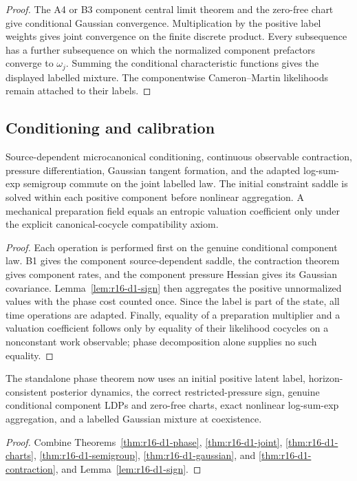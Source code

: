 \begin{proof}
The A4 or B3 component central limit theorem and the zero-free chart give
conditional Gaussian convergence.  Multiplication by the positive label
weights gives joint convergence on the finite discrete product.  Every
subsequence has a further subsequence on which the normalized component
prefactors converge to \(\omega_j\).  Summing the conditional characteristic
functions gives the displayed labelled mixture.  The componentwise
Cameron--Martin likelihoods remain attached to their labels.
\end{proof}

\subsection{Conditioning and calibration}

\begin{theorem}
\label{thm:r16-d1-contraction}
Source-dependent microcanonical conditioning, continuous observable
contraction, pressure differentiation, Gaussian tangent formation, and the
adapted log-sum-exp semigroup commute on the joint labelled law.  The initial
constraint saddle is solved within each positive component before nonlinear
aggregation.  A mechanical preparation field equals an entropic valuation
coefficient only under the explicit canonical-cocycle compatibility axiom.
\end{theorem}

\begin{proof}
Each operation is performed first on the genuine conditional component law.
B1 gives the component source-dependent saddle, the contraction theorem gives
component rates, and the component pressure Hessian gives its Gaussian
covariance.  Lemma~\ref{lem:r16-d1-sign} then aggregates the positive
unnormalized values with the phase cost counted once.  Since the label is part
of the state, all time operations are adapted.  Finally, equality of a
preparation multiplier and a valuation coefficient follows only by equality
of their likelihood cocycles on a nonconstant work observable; phase
decomposition alone supplies no such equality.
\end{proof}

\begin{theorem}
\label{thm:r16-d1-main}
The standalone phase theorem now uses an initial positive latent label,
horizon-consistent posterior dynamics, the correct restricted-pressure sign,
genuine conditional component LDPs and zero-free charts, exact nonlinear
log-sum-exp aggregation, and a labelled Gaussian mixture at coexistence.
\end{theorem}

\begin{proof}
Combine Theorems~\ref{thm:r16-d1-phase},
\ref{thm:r16-d1-joint}, \ref{thm:r16-d1-charts},
\ref{thm:r16-d1-semigroup}, \ref{thm:r16-d1-gaussian}, and
\ref{thm:r16-d1-contraction}, and
Lemma~\ref{lem:r16-d1-sign}.
\end{proof}
